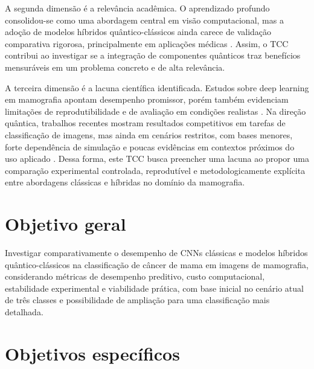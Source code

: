 \documentclass[
    12pt,
    openright,
    oneside,
    a4paper,
    english,
    brazil
]{abntex2}
\begin{document}
A segunda dimensão é a relevância acadêmica. O aprendizado profundo consolidou-se como uma abordagem central em visão computacional, mas a adoção de modelos híbridos quântico-clássicos ainda carece de validação comparativa rigorosa, principalmente em aplicações médicas \cite{LeCun2015,Gupta2025QMLDigitalHealth}. Assim, o TCC contribui ao investigar se a integração de componentes quânticos traz benefícios mensuráveis em um problema concreto e de alta relevância.

A terceira dimensão é a lacuna científica identificada. Estudos sobre deep learning em mamografia apontam desempenho promissor, porém também evidenciam limitações de reprodutibilidade e de avaliação em condições realistas \cite{Bhalla2023MammographyReview}. Na direção quântica, trabalhos recentes mostram resultados competitivos em tarefas de classificação de imagens, mas ainda em cenários restritos, com bases menores, forte dependência de simulação e poucas evidências em contextos próximos do uso aplicado \cite{long2025qcqcnn}. Dessa forma, este TCC busca preencher uma lacuna ao propor uma comparação experimental controlada, reprodutível e metodologicamente explícita entre abordagens clássicas e híbridas no domínio da mamografia.



\section{Objetivo geral}

Investigar comparativamente o desempenho de CNNs clássicas e modelos híbridos quântico-clássicos na classificação de câncer de mama em imagens de mamografia, considerando métricas de desempenho preditivo, custo computacional, estabilidade experimental e viabilidade prática, com base inicial no cenário atual de três classes e possibilidade de ampliação para uma classificação mais detalhada.


\section{Objetivos específicos}
\end{document}

